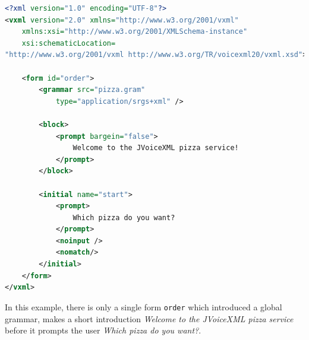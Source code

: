 \documentclass[11pt,a4paper]{book}
\begin{document}
\begin{lstlisting}[language=XML]
<?xml version="1.0" encoding="UTF-8"?>
<vxml version="2.0" xmlns="http://www.w3.org/2001/vxml"
    xmlns:xsi="http://www.w3.org/2001/XMLSchema-instance"
    xsi:schematicLocation=
"http://www.w3.org/2001/vxml http://www.w3.org/TR/voicexml20/vxml.xsd">

    <form id="order">
        <grammar src="pizza.gram"
            type="application/srgs+xml" />

        <block>
            <prompt bargein="false">
                Welcome to the JVoiceXML pizza service!
            </prompt>
        </block>

        <initial name="start">
            <prompt>
                Which pizza do you want?
            </prompt>
            <noinput />
            <nomatch/>
        </initial>
    </form>
</vxml>
\end{lstlisting}

In this example, there is only a single form \lstinline{order} which introduced
a global grammar, makes a short introduction \emph{Welcome to the JVoiceXML
pizza service} before it prompts the user \emph{Which pizza do you want?}.
\end{document}
